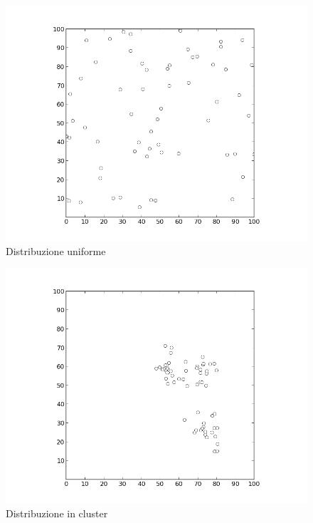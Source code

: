 \documentclass[preprint,12pt]{elsarticle}
\begin{document}
\begin{figure}[htbp]
\centering
\includegraphics[scale=0.50]{grafici_istanze/random_60.png} 
\caption{Distribuzione uniforme}\label{fig:1}
\end{figure}

\begin{figure}[htbp]
\centering
\includegraphics[scale=0.50]{grafici_istanze/cluster_60.png} 
\caption{Distribuzione in cluster}\label{fig:2}
\end{figure}
\end{document}
